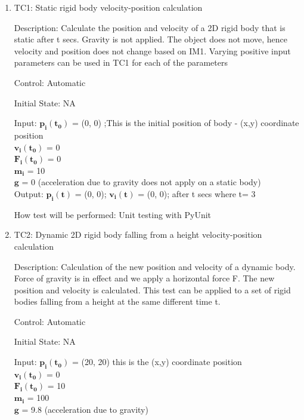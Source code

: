 \documentclass[12pt, titlepage]{article}
\begin{document}
\begin{enumerate}

\item{TC1: Static rigid body velocity-position calculation\\}

Description: Calculate the position and velocity of a 2D rigid body that is static after t secs. Gravity is not applied. The object does not move, hence velocity and position does not change based on IM1. Varying positive input parameters can be used in TC1 for each of the parameters

Control: Automatic
					
Initial State: NA
					
Input: $\mathbf{p_i}$$\mathbf{(t_0)}$ = (0, 0) ;This is the initial position of body - (x,y) coordinate position\\
       \hspace*{1.3cm}$\mathbf{v_i}$$\mathbf{(t_0)}$ = 0\\
       \hspace*{1.3cm}$\mathbf{F_i}$$\mathbf{(t_0)}$ = 0\\
       \hspace*{1.3cm}$\mathbf{m_i}$$ \mathbf{}$ = 10\\
       \hspace*{1.3cm}$\mathbf{g}$$\mathbf{}$ = 0 (acceleration due to gravity does not apply on a static body)\\
					
Output:  $\mathbf{p_i}$$\mathbf{(t)}$ = (0, 0);
         $\mathbf{v_i}$$\mathbf{(t)}$ = (0, 0); after t secs where t= 3 
					
How test will be performed: Unit testing with PyUnit
					
\item{TC2: Dynamic 2D rigid body falling from a height velocity-position calculation\\}

Description: Calculation of the new position and velocity of a dynamic body. Force of gravity is in effect and we apply a horizontal force F. The new position and velocity is calculated. This test can be applied to a set of rigid bodies falling from a height at the same different time t.
 
Control: Automatic
					
Initial State: NA
					
Input: $\mathbf{p_i}$$\mathbf{(t_0)}$ = (20, 20) this is the (x,y) coordinate position\\
	   \hspace*{1.3cm}$\mathbf{v_i}$$\mathbf{(t_0)}$ = 0\\
	   \hspace*{1.3cm}$\mathbf{F_i}$$\mathbf{(t_0)}$ = 10\\
	   \hspace*{1.3cm}$\mathbf{m_i}$$ \mathbf{}$ = 100\\
	   \hspace*{1.3cm}$\mathbf{g}$$\mathbf{}$ = 9.8 (acceleration due to gravity)\\
	   

\end{enumerate}
\end{document}
